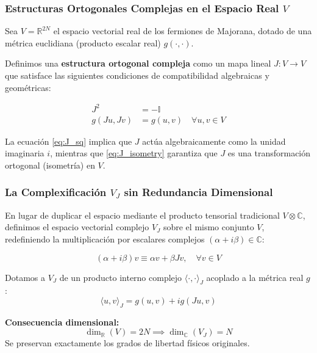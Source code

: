 
\begin{frame}
  \frametitle{Estructuras Ortogonales Complejas en el Espacio Real $V$}

  Sea $V = \mathbb{R}^{2N}$ el espacio vectorial real de los fermiones de Majorana, dotado de una métrica euclidiana (producto escalar real) $g(\cdot, \cdot)$.

  \vspace{0.3cm}
  Definimos una \textbf{estructura ortogonal compleja} como un mapa lineal $J: V \to V$ que satisface las siguientes condiciones de compatibilidad algebraicas y geométricas:
  
  \begin{align}
    J^2 &= -\mathbb{I} \label{eq:J_sq} \\
    g(Ju, Jv) &= g(u, v) \quad \forall u, v \in V \label{eq:J_isometry}
  \end{align}

  \vspace{0.2cm}
  La ecuación \eqref{eq:J_sq} implica que $J$ actúa algebraicamente como la unidad imaginaria $i$, mientras que \eqref{eq:J_isometry} garantiza que $J$ es una transformación ortogonal (isometría) en $V$.
\end{frame}

\begin{frame}
  \frametitle{La Complexificación $V_J$ sin Redundancia Dimensional}

  En lugar de duplicar el espacio mediante el producto tensorial tradicional $V \otimes \mathbb{C}$, definimos el espacio vectorial complejo $V_J$ sobre el mismo conjunto $V$, redefiniendo la multiplicación por escalares complejos $(\alpha + i\beta) \in \mathbb{C}$:
  
  \begin{equation}
    (\alpha + i \beta)v \equiv \alpha v + \beta J v, \quad \forall v \in V
    \label{eq:complexification_J}
  \end{equation}

  Dotamos a $V_J$ de un producto interno complejo $\langle \cdot, \cdot \rangle_J$ acoplado a la métrica real $g$:
  \begin{equation}
    \langle u, v \rangle_J = g(u, v) + i g(Ju, v)
    \label{eq:inner_product_J}
  \end{equation}

  \vspace{0.2cm}
  \textbf{Consecuencia dimensional:}
  \begin{equation*}
    \dim_\mathbb{R}(V) = 2N \implies \dim_\mathbb{C}(V_J) = N
  \end{equation*}
  Se preservan exactamente los grados de libertad físicos originales.
\end{frame}

